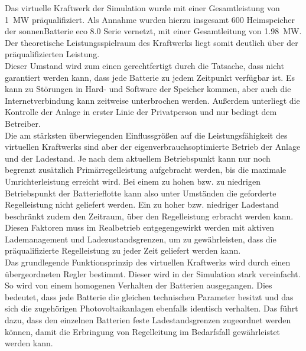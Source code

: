 Das virtuelle Kraftwerk der Simulation wurde mit einer Gesamtleistung von \SI{1}{\mega\watt} präqualifiziert. Als Annahme wurden hierzu insgesamt 600 Heimspeicher der sonnenBatterie eco 8.0 Serie vernetzt, mit einer Gesamtleitung von \SI{1.98}{\mega\watt}. Der theoretische Leistungsspielraum des Kraftwerks liegt somit deutlich über der präqualifizierten Leistung.\\
Dieser Umstand wird zum einen gerechtfertigt durch die Tatsache, dass nicht garantiert werden kann, dass jede Batterie zu jedem Zeitpunkt verfügbar ist. Es kann zu Störungen in Hard- und Software der Speicher kommen, aber auch die Internetverbindung kann zeitweise unterbrochen werden. Außerdem unterliegt die Kontrolle der Anlage in erster Linie der Privatperson und nur bedingt dem Betreiber.\\
Die am stärksten überwiegenden Einflussgrößen auf die Leistungsfähigkeit des virtuellen Kraftwerks sind aber der eigenverbrauchsoptimierte Betrieb der Anlage und der Ladestand. Je nach dem aktuellem Betriebspunkt kann nur noch begrenzt zusätzlich Primärregelleistung aufgebracht werden, bis die maximale Umrichterleistung erreicht wird. Bei einem zu hohen bzw. zu niedrigen Betriebspunkt der Batterieflotte kann also unter Umständen die geforderte Regelleistung nicht geliefert werden. Ein zu hoher bzw. niedriger Ladestand beschränkt zudem den Zeitraum, über den Regelleistung erbracht werden kann. Diesen Faktoren muss im Realbetrieb entgegengewirkt werden mit aktiven Lademanagement und Ladezustandsgrenzen, um zu gewährleisten, dass die präqualifizierte Regelleistung zu jeder Zeit geliefert werden kann.\\
Das grundlegende Funktionsprinzip des virtuellen Kraftwerks wird durch einen übergeordneten Regler bestimmt. Dieser wird in der Simulation stark vereinfacht. So wird von einem homogenen Verhalten der Batterien ausgegangen. Dies bedeutet, dass jede Batterie  die gleichen technischen Parameter besitzt und das sich die zugehörigen Photovoltaikanlagen ebenfalls identisch verhalten. Das führt dazu, dass den einzelnen Batterien feste Ladestandsgrenzen zugeordnet werden können, damit die Erbringung von Regelleitung im Bedarfsfall gewährleistet werden kann.

